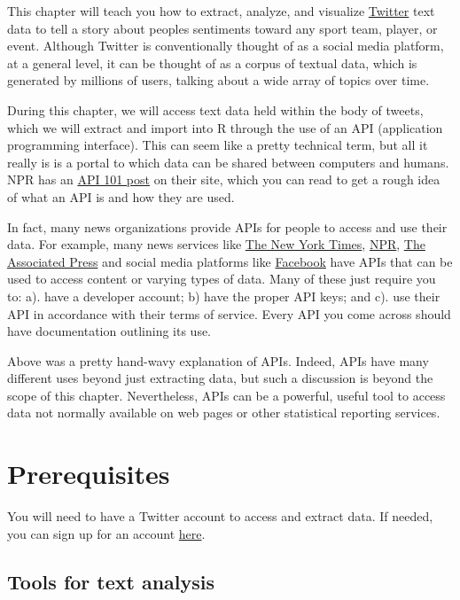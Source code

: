 \documentclass[
]{book}
\begin{document}
This chapter will teach you how to extract, analyze, and visualize \href{www.twitter.com}{Twitter} text data to tell a story about peoples sentiments toward any sport team, player, or event. Although Twitter is conventionally thought of as a social media platform, at a general level, it can be thought of as a corpus of textual data, which is generated by millions of users, talking about a wide array of topics over time.

During this chapter, we will access text data held within the body of tweets, which we will extract and import into R through the use of an API (application programming interface). This can seem like a pretty technical term, but all it really is is a portal to which data can be shared between computers and humans. NPR has an \href{https://digitalservices.npr.org/post/api-101-what-api}{API 101 post} on their site, which you can read to get a rough idea of what an API is and how they are used.

In fact, many news organizations provide APIs for people to access and use their data. For example, many news services like \href{https://developer.nytimes.com/}{The New York Times}, \href{https://www.npr.org/api/index}{NPR}, \href{https://developer.ap.org/}{The Associated Press} and social media platforms like \href{https://developers.facebook.com/docs/apis-and-sdks/}{Facebook} have APIs that can be used to access content or varying types of data. Many of these just require you to: a). have a developer account; b) have the proper API keys; and c). use their API in accordance with their terms of service. Every API you come across should have documentation outlining its use.

Above was a pretty hand-wavy explanation of APIs. Indeed, APIs have many different uses beyond just extracting data, but such a discussion is beyond the scope of this chapter. Nevertheless, APIs can be a powerful, useful tool to access data not normally available on web pages or other statistical reporting services.

\hypertarget{prerequisites}{%
\section{Prerequisites}\label{prerequisites}}

You will need to have a Twitter account to access and extract data. If needed, you can sign up for an account \href{https://twitter.com/i/flow/signup}{here}.

\hypertarget{tools-for-text-analysis}{%
\subsection{Tools for text analysis}\label{tools-for-text-analysis}}
\end{document}
